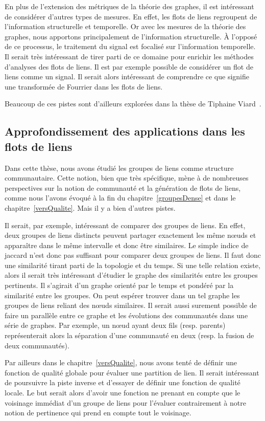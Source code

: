 En plus de l'extension des métriques de la théorie  des graphes, il est intéressant de considérer d'autres types de mesures.
En effet, les flots de liens regroupent de l'information structurelle et temporelle.
Or avec les mesures de la théorie des graphes, nous apportons principalement de l'information structurelle.
\`A l'opposé de ce processus, le traitement du signal est focalisé sur l'information temporelle.
Il serait très intéressant de tirer parti de ce domaine pour enrichir les méthodes d'analyses des flots de liens.
Il est par exemple possible de considérer un flot de liens comme un signal.
Il serait alors intéressant de comprendre ce que signifie une transformée de Fourrier dans les flots de liens.

Beaucoup de ces pistes sont d'ailleurs explorées dans la thèse de Tiphaine Viard~\cite{viard2016flots}.

\subsection{Approfondissement des applications dans les flots de liens}
Dans cette thèse, nous avons étudié les groupes de liens comme structure communautaire.
Cette notion, bien que très spécifique, mène à de nombreuses perspectives sur la notion de communauté et la génération de flots de liens, comme nous l'avons évoqué à la fin du chapitre~\ref{groupesDense} et dans le chapitre~\ref{versQualite}.
Mais il y a bien d'autres pistes.

Il serait, par exemple, intéressant de comparer des groupes de liens.
En effet, deux groupes de liens distincts peuvent partager exactement les même n\oe uds et apparaître dans le même intervalle et donc être similaires.
Le simple indice de jaccard n'est donc pas suffisant pour comparer deux groupes de liens.
Il faut donc une similarité tirant parti de la topologie et du temps.
Si une telle relation existe, alors il serait très intéressant d'étudier le graphe des similarités entre les groupes pertinents.
Il s'agirait d'un graphe orienté par le temps et pondéré par la similarité entre les groupes.
On peut espérer trouver dans un tel graphe les groupes de liens reliant des n\oe uds similaires.
Il serait aussi surement possible de faire un parallèle entre ce graphe et les évolutions des communautés dans une série de graphes.
Par exemple, un n\oe ud ayant deux fils (resp. parents) représenterait alors la séparation d'une communauté en deux (resp. la fusion de deux communautés).

Par ailleurs dans le chapitre~\ref{versQualite}, nous avons tenté de définir une fonction de qualité globale pour évaluer une partition de lien.
Il serait intéressant de poursuivre la piste inverse et d'essayer de définir une fonction de qualité locale.
Le but serait alors d'avoir une fonction ne prenant en compte que le voisinage immédiat d'un groupe de liens pour l'évaluer contrairement à notre notion de pertinence qui prend en compte tout le voisinage.

